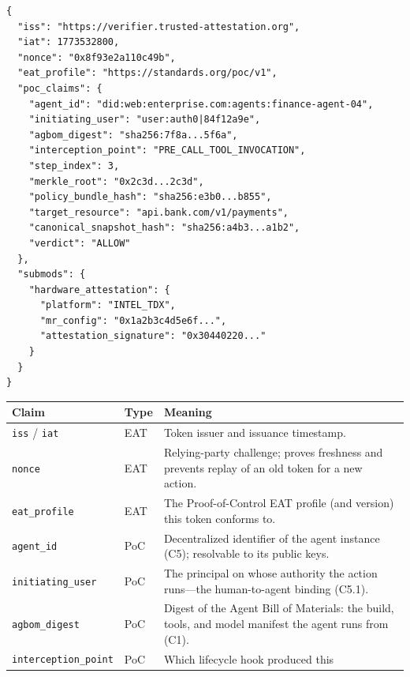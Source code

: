 \documentclass[11pt]{article}
\newcommand{\poc}{Proof-of-Control}
\begin{document}
\begin{listing}[p]
\begin{verbatim}
{
  "iss": "https://verifier.trusted-attestation.org",
  "iat": 1773532800,
  "nonce": "0x8f93e2a110c49b",
  "eat_profile": "https://standards.org/poc/v1",
  "poc_claims": {
    "agent_id": "did:web:enterprise.com:agents:finance-agent-04",
    "initiating_user": "user:auth0|84f12a9e",
    "agbom_digest": "sha256:7f8a...5f6a",
    "interception_point": "PRE_CALL_TOOL_INVOCATION",
    "step_index": 3,
    "merkle_root": "0x2c3d...2c3d",
    "policy_bundle_hash": "sha256:e3b0...b855",
    "target_resource": "api.bank.com/v1/payments",
    "canonical_snapshot_hash": "sha256:a4b3...a1b2",
    "verdict": "ALLOW"
  },
  "submods": {
    "hardware_attestation": {
      "platform": "INTEL_TDX",
      "mr_config": "0x1a2b3c4d5e6f...",
      "attestation_signature": "0x30440220..."
    }
  }
}
\end{verbatim}
\caption{A \poc{} Evidence token (EAT, JWT rendering) emitted at the
pre-call tool-invocation hook. Claim-by-claim definitions follow in
Table~\ref{tab:claims} below. Two claims the table defines,
\texttt{chain\_head} and \texttt{tree\_size}, are absent from this token;
both are carried once the log of \S\ref{sec:merkle} is in use.}
\label{lst:eat}
\vspace{1.2em}
\centering\scriptsize
\begin{tabular}{@{}llp{8.1cm}@{}}
\toprule
\textbf{Claim} & \textbf{Type} & \textbf{Meaning} \\
\midrule
\texttt{iss} / \texttt{iat} & EAT & Token issuer and issuance timestamp. \\
\texttt{nonce} & EAT & Relying-party challenge; proves freshness and
prevents replay of an old token for a new action. \\
\texttt{eat\_profile} & EAT & The \poc{} EAT profile (and version) this
token conforms to. \\
\texttt{agent\_id} & PoC & Decentralized identifier of the agent instance
(C5); resolvable to its public keys. \\
\texttt{initiating\_user} & PoC & The principal on whose authority the
action runs---the human-to-agent binding (C5.1). \\
\texttt{agbom\_digest} & PoC & Digest of the Agent Bill of Materials: the
build, tools, and model manifest the agent runs from (C1). \\
\texttt{interception\_point} & PoC & Which lifecycle hook produced this

\end{tabular}
\end{listing}
\end{document}
